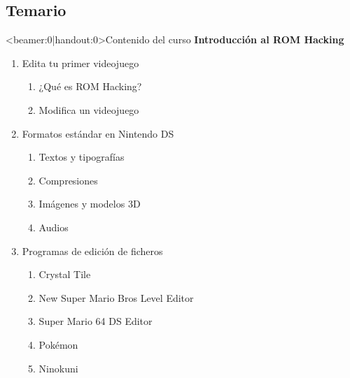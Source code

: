 \subsection{Temario}
\begin{frame}<beamer:0|handout:0>{Contenido del curso}
    \centering
    \textbf{Introducción al ROM Hacking}
    \begin{enumerate}
        \item<+-> Edita tu primer videojuego
        \begin{enumerate}
            \item ¿Qué es ROM Hacking?
            \item Modifica un videojuego
        \end{enumerate}
        \item<+-> Formatos estándar en Nintendo DS
        \begin{enumerate}
            \item Textos y tipografías
            \item Compresiones
            \item Imágenes y modelos 3D
            \item Audios
        \end{enumerate}
        \item<+-> Programas de edición de ficheros
        \begin{enumerate}
            \item Crystal Tile
            \item New Super Mario Bros Level Editor
            \item Super Mario 64 DS Editor
            \item Pokémon
            \item Ninokuni
        \end{enumerate}
    \end{enumerate}
\end{frame}

